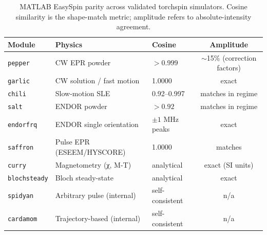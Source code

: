 \begin{table}[h]
\centering
\caption{MATLAB EasySpin parity across validated torchspin simulators. Cosine similarity is the shape-match metric; amplitude refers to absolute-intensity agreement.}
\label{tab:parity}
\begin{tabular}{lllc}
\toprule
Module & Physics & Cosine & Amplitude \\
\midrule
\texttt{pepper} & CW EPR powder & $>0.999$ & $\sim$15\% (correction factors) \\
\texttt{garlic} & CW solution / fast motion & 1.0000 & exact \\
\texttt{chili} & Slow-motion SLE & 0.92--0.997 & matches in regime \\
\texttt{salt} & ENDOR powder & $>0.92$ & matches in regime \\
\texttt{endorfrq} & ENDOR single orientation & $\pm 1$ MHz peaks & exact \\
\texttt{saffron} & Pulse EPR (ESEEM/HYSCORE) & 1.0000 & matches \\
\texttt{curry} & Magnetometry (χ, M-T) & analytical & exact (SI units) \\
\texttt{blochsteady} & Bloch steady-state & analytical & exact \\
\texttt{spidyan} & Arbitrary pulse (internal) & self-consistent & n/a \\
\texttt{cardamom} & Trajectory-based (internal) & self-consistent & n/a \\
\bottomrule
\end{tabular}
\end{table}
